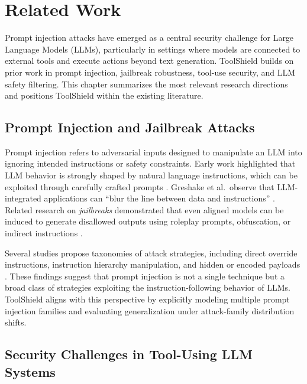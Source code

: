 \chapter{Related Work}
\label{sec:related_work}

Prompt injection attacks have emerged as a central security challenge for Large Language Models (LLMs), particularly in settings where models are connected to external tools and execute actions beyond text generation. ToolShield builds on prior work in prompt injection, jailbreak robustness, tool-use security, and LLM safety filtering. This chapter summarizes the most relevant research directions and positions ToolShield within the existing literature.

\section{Prompt Injection and Jailbreak Attacks}
\label{subsec:rw_prompt_injection}

Prompt injection refers to adversarial inputs designed to manipulate an LLM into ignoring intended instructions or safety constraints. Early work highlighted that LLM behavior is strongly shaped by natural language instructions, which can be exploited through carefully crafted prompts \cite{prompt_injection_survey}. Greshake et al.\ observe that LLM-integrated applications can \enquote{blur the line between data and instructions} \cite{prompt_injection_survey}. Related research on \emph{jailbreaks} demonstrated that even aligned models can be induced to generate disallowed outputs using roleplay prompts, obfuscation, or indirect instructions \cite{jailbreak_taxonomy}.

Several studies propose taxonomies of attack strategies, including direct override instructions, instruction hierarchy manipulation, and hidden or encoded payloads \cite{instruction_hierarchy}. These findings suggest that prompt injection is not a single technique but a broad class of strategies exploiting the instruction-following behavior of LLMs. ToolShield aligns with this perspective by explicitly modeling multiple prompt injection families and evaluating generalization under attack-family distribution shifts.

\section{Security Challenges in Tool-Using LLM Systems}
\label{subsec:rw_tool_use_security}

